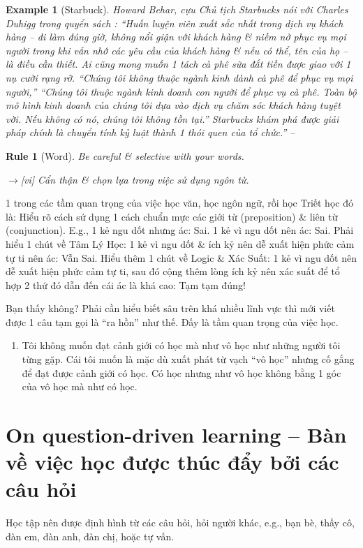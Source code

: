 \documentclass[12pt,oneside]{book}
\newtheorem{example}{Example}
\newtheorem{Rule}{Rule}
\begin{document}
\begin{example}[Starbuck]
	Howard Behar, cựu Chủ tịch Starbucks nói với {\rm Charles Duhigg} trong quyển sách {\rm\cite{Duhigg_habit}}: ``Huấn luyện viên xuất sắc nhất trong dịch vụ khách hàng -- đi làm đúng giờ, không nổi giận với khách hàng \& niềm nở phục vụ mọi người trong khi vẫn nhớ các yêu cầu của khách hàng \& nếu có thể, tên của họ -- là điều cần thiết. Ai cũng mong muốn 1 tách cà phê sữa đắt tiền được giao với 1 nụ cười rạng rỡ. ``Chúng tôi không thuộc ngành kinh dành cà phê để phục vụ mọi người,'' ``Chúng tôi thuộc ngành kinh doanh con người để phục vụ cà phê. Toàn bộ mô hình kinh doanh của chúng tôi dựa vào dịch vụ chăm sóc khách hàng tuyệt vời. Nếu không có nó, chúng tôi không tồn tại.'' Starbucks khám phá được giải pháp chính là chuyển tính kỷ luật thành 1 thói quen của tổ chức.'' -- {\rm\cite[p. 220]{Duhigg_habit_VN}}
\end{example}

\begin{Rule}[Word]
	Be careful \& selective with your words.
	
	{\sf[en]$\to$[vi]} Cẩn thận \& chọn lựa trong việc sử dụng ngôn từ.
\end{Rule}
1 trong các tầm quan trọng của việc học văn, học ngôn ngữ, rồi học Triết học đó là: Hiểu rõ cách sử dụng 1 cách chuẩn mực các giới từ (preposition) \& liên từ (conjunction). E.g., 1 kẻ ngu dốt nhưng ác: Sai. 1 kẻ vì ngu dốt nên ác: Sai. Phải hiểu 1 chút về Tâm Lý Học: 1 kẻ vì ngu dốt \& ích kỷ nên dễ xuất hiện phức cảm tự ti nên ác: Vẫn Sai. Hiểu thêm 1 chút về Logic \& Xác Suất: 1 kẻ vì ngu dốt nên dễ xuất hiện phức cảm tự ti, sau đó cộng thêm lòng ích kỷ nên xác suất để tổ hợp 2 thứ đó dẫn đến cái ác là khá cao: Tạm tạm đúng!

Bạn thấy không? Phải cần hiểu biết sâu trên khá nhiều lĩnh vực thì mới viết được 1 câu tạm gọi là ``ra hồn'' như thế. Đấy là tầm quan trọng của việc học.
\begin{enumerate}
	\item Tôi không muốn đạt cảnh giới có học mà như vô học như những người tôi từng gặp. Cái tôi muốn là mặc dù xuất phát từ vạch ``vô học'' nhưng cố gắng để đạt được cảnh giới có học. Có học nhưng như vô học không bằng 1 góc của vô học mà như có học.
\end{enumerate}

\section{On question-driven learning -- Bàn về việc học được thúc đẩy bởi các câu hỏi}
Học tập nên được định hình từ các câu hỏi, hỏi người khác, e.g., bạn bè, thầy cô, đàn em, đàn anh, đàn chị, hoặc tự vấn.
\end{document}
